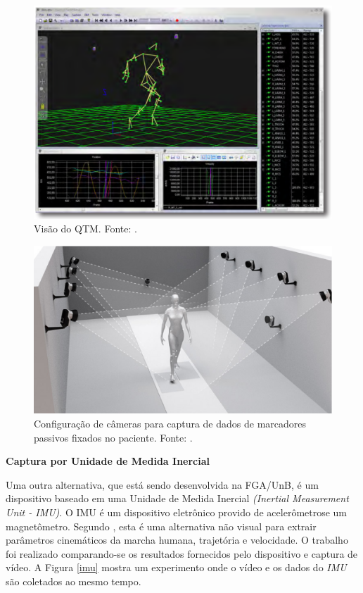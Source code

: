 \begin{figure}[H]
	\centering
	\includegraphics[width=15cm]{figuras/qtm.eps}
	\caption{Visão do QTM. Fonte: .}
	\label{visao_qtm}
	
\end{figure}


\begin{figure}[H]
	\centering
	\includegraphics[width=14cm]{figuras/markers.eps}
	\caption{Configuração de câmeras para captura de dados de marcadores passivos fixados no paciente. Fonte: .}
	\label{markers}
	
\end{figure}


\textbf{Captura por Unidade de Medida Inercial}

\noindent
Uma outra alternativa, que está sendo desenvolvida na FGA/UnB, é um dispositivo baseado em uma Unidade de Medida Inercial \emph{(Inertial Measurement Unit - IMU)}. O IMU é um dispositivo eletrônico provido de acelerômetrose um magnetômetro.
Segundo , esta é uma alternativa não visual para extrair parâmetros cinemáticos da marcha humana, trajetória e velocidade. 
O trabalho foi realizado comparando-se os resultados fornecidos pelo dispositivo e captura de vídeo.
A Figura \ref{imu} mostra um experimento onde o vídeo e os dados do \emph{IMU} são coletados ao mesmo tempo.



